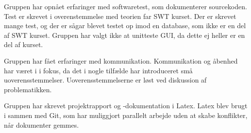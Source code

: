 Gruppen har opnået erfaringer med softwaretest,  som dokumenterer sourcekoden. Test er skrevet i overenstemmelse med teorien far SWT kurset. Der er skrevet mange test, og der er sågar blevet testet op imod en database, som ikke er en del af SWT kurset. Gruppen har valgt ikke at unitteste GUI, da dette ej heller er en del af kurset. 

Gruppen har fået erfaringer med kommunikation. Kommunikation og åbenhed har været i i fokus, da det i nogle tilfælde har introduceret små uoverensstemmelser. Uoverensstemmelserne er løst ved diskussion af problematikken. 

Gruppen har skrevet projektrapport og -dokumentation i Latex. Latex blev brugt i sammen med Git, som har muliggjort parallelt arbejde uden at skabe konflikter, når dokumenter gemmes. 